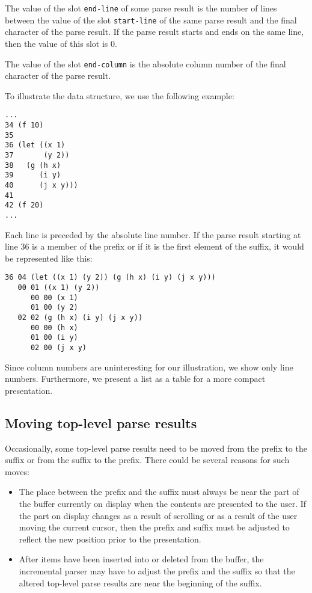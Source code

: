 The value of the slot \texttt{end-line} of some parse result is the
number of lines between the value of the slot \texttt{start-line} of
the same parse result and the final character of the parse result.
If the parse result starts and ends on the same line, then the value
of this slot is $0$.

The value of the slot \texttt{end-column} is the absolute column
number of the final character of the parse result.

To illustrate the data structure, we use the following example:

\begin{verbatim}
...
34 (f 10)
35
36 (let ((x 1)
37       (y 2))
38   (g (h x)
39      (i y)
40      (j x y)))
41
42 (f 20)
...
\end{verbatim}

Each line is preceded by the absolute line number.  If the parse
result starting at line 36 is a member of the prefix or if it is the
first element of the suffix, it would be represented like this:

\begin{verbatim}
36 04 (let ((x 1) (y 2)) (g (h x) (i y) (j x y)))
   00 01 ((x 1) (y 2))
      00 00 (x 1)
      01 00 (y 2)
   02 02 (g (h x) (i y) (j x y))
      00 00 (h x)
      01 00 (i y)
      02 00 (j x y)
\end{verbatim}

Since column numbers are uninteresting for our illustration, we
show only line numbers.  Furthermore, we present a list as a table for
a more compact presentation.

\subsection{Moving top-level parse results}

Occasionally, some top-level parse results need to be moved from the
prefix to the suffix or from the suffix to the prefix.  There could be
several reasons for such moves:

\begin{itemize}
\item The place between the prefix and the suffix must always be near
  the part of the buffer currently on display when the contents are
  presented to the user.  If the part on display changes as a result
  of scrolling or as a result of the user moving the current cursor,
  then the prefix and suffix must be adjusted to reflect the new
  position prior to the presentation.
\item After items have been inserted into or deleted from the buffer,
  the incremental parser may have to adjust the prefix and the suffix
  so that the altered top-level parse results are near the beginning
  of the suffix.
\end{itemize}

